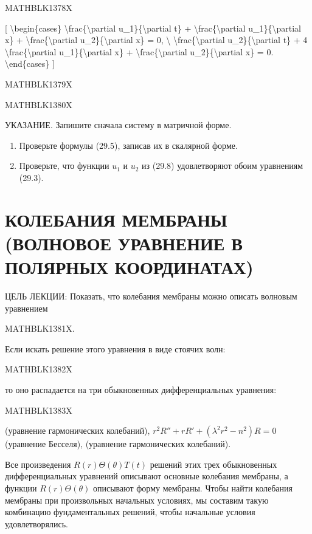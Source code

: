 \documentclass[
]{article}
\begin{document}
MATHBLK1378X

{[} \textbackslash begin\{cases\}
\textbackslash frac\{\textbackslash partial
u\_1\}\{\textbackslash partial t\} +
\textbackslash frac\{\textbackslash partial
u\_1\}\{\textbackslash partial x\} +
\textbackslash frac\{\textbackslash partial
u\_2\}\{\textbackslash partial x\} = 0, \textbackslash{}
\textbackslash frac\{\textbackslash partial
u\_2\}\{\textbackslash partial t\} + 4
\textbackslash frac\{\textbackslash partial
u\_1\}\{\textbackslash partial x\} +
\textbackslash frac\{\textbackslash partial
u\_2\}\{\textbackslash partial x\} = 0. \textbackslash end\{cases\} {]}

MATHBLK1379X

MATHBLK1380X

УКАЗАНИЕ. Запишите сначала систему в матричной форме.

\begin{enumerate}
\def\labelenumi{\arabic{enumi}.}
\setcounter{enumi}{3}
\item
  Проверьте формулы (29.5), записав их в скалярной форме.
\item
  Проверьте, что функции \(u_1\) и \(u_2\) из (29.8) удовлетворяют обоим
  уравнениям (29.3).
\end{enumerate}

\section{КОЛЕБАНИЯ МЕМБРАНЫ (ВОЛНОВОЕ УРАВНЕНИЕ В ПОЛЯРНЫХ
КООРДИНАТАХ)}\label{ux43aux43eux43bux435ux431ux430ux43dux438ux44f-ux43cux435ux43cux431ux440ux430ux43dux44b-ux432ux43eux43bux43dux43eux432ux43eux435-ux443ux440ux430ux432ux43dux435ux43dux438ux435-ux432-ux43fux43eux43bux44fux440ux43dux44bux445-ux43aux43eux43eux440ux434ux438ux43dux430ux442ux430ux445}

ЦЕЛЬ ЛЕКЦИИ: Показать, что колебания мембраны можно описать волновым
уравнением

MATHBLK1381X.

Если искать решение этого уравнения в виде стоячих волн:

MATHBLK1382X

то оно распадается на три обыкновенных дифференциальных уравнения:

MATHBLK1383X

(уравнение гармонических колебаний),
\(r^2 R'' + rR' + (\lambda^2 r^2 - n^2) R = 0\) (уравнение Бесселя),
(уравнение гармонических колебаний).

Все произведения \(R(r) \Theta(\theta) T(t)\) решений этих трех
обыкновенных дифференциальных уравнений описывают основные колебания
мембраны, а функции \(R(r) \Theta(\theta)\) описывают форму мембраны.
Чтобы найти колебания мембраны при произвольных начальных условиях, мы
составим такую комбинацию фундаментальных решений, чтобы начальные
условия удовлетворялись.
\end{document}
